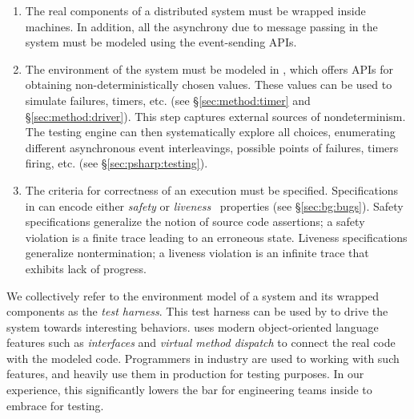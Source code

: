 \begin{enumerate}
\item The real components of a distributed system must be wrapped inside \psharp machines. In addition, all the asynchrony due to message passing in the system must be modeled using the \psharp event-sending APIs. 

\item The environment of the system must be modeled in \psharp, which offers APIs for obtaining non-deterministically chosen values. These values can be used to simulate failures, timers, etc. (see \S\ref{sec:method:timer} and \S\ref{sec:method:driver}). This step captures external sources of nondeterminism. The \psharp testing engine can then systematically explore all choices, enumerating different asynchronous event interleavings, possible points of failures, timers firing, etc. (see \S\ref{sec:psharp:testing}).

\item The criteria for correctness of an execution must be specified. Specifications in \psharp can encode either \emph{safety} or \emph{liveness}~\cite{lamport1977proving} properties (see \S\ref{sec:bg:bugs}). Safety specifications generalize the notion of source code assertions; a safety violation is a finite trace leading to an erroneous state. Liveness specifications generalize nontermination; a liveness violation is an infinite trace that exhibits lack of progress.

\end{enumerate}

\noindent
We collectively refer to the environment model of a system and its wrapped components as the \psharp \emph{test harness}. This test harness can be used by \psharp to drive the system towards interesting behaviors.
\psharp uses modern object-oriented language features such as \emph{interfaces} and \emph{virtual method dispatch} to connect the real code with the modeled code. Programmers in industry are used to working with such features, and heavily use them in production for testing purposes. In our experience, this significantly lowers the bar for engineering teams inside \Microsoft to embrace \psharp for testing.

